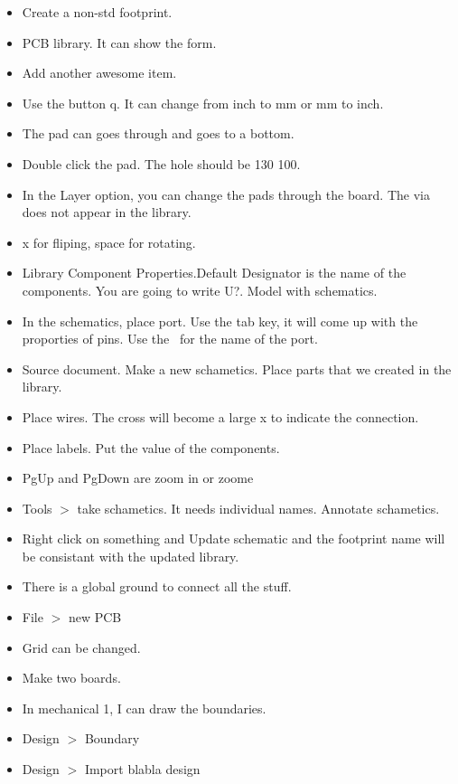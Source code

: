 \documentclass[]{article}
\begin{document}
\begin{itemize}
            \item   Create a non-std footprint.
            \item   PCB library. It can show the form.
            \item   Add another awesome item.
            \item   Use the button q. It can change from inch to mm or mm to inch.
            \item   The pad can goes through and goes to a bottom.
            \item   Double click the pad. The hole should be 130 100.
            \item   In the Layer option, you can change the pads through the board. The via does not appear in the library.
            \item   x for fliping, space for rotating.
            \item   Library Component Properties.Default Designator is the name of the components. You are going to write U?. Model with schematics.
            \item   In the schematics, place port. Use the tab key, it will come up with the proporties of pins. Use the \ for the name of the
                    port.
            \item   Source document. Make a new schametics. Place parts that we created in the library.
            \item   Place wires. The cross will become a large x to indicate the connection.
            \item   Place labels. Put the value of the components.
            \item   PgUp and PgDown are zoom in or zoome
            \item   Tools $>$ take schametics. It needs individual names. Annotate schametics.
            \item   Right click on something and Update schematic and the footprint name will be consistant with the updated library.
            \item   There is a global ground to connect all the stuff.
            \item   File $>$ new PCB
            \item   Grid can be changed.
            \item   Make two boards.
            \item   In mechanical 1, I can draw the boundaries.
            \item   Design $>$ Boundary 
            \item   Design $>$ Import blabla design

\end{itemize}
\end{document}
